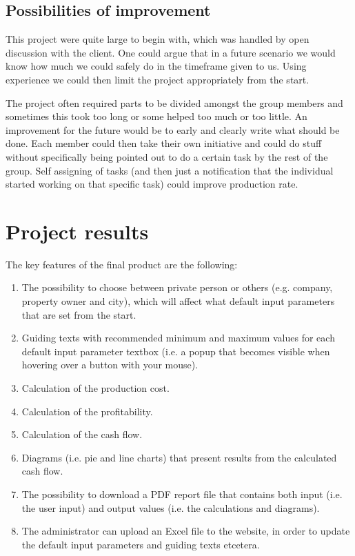\documentclass[]{article}
\begin{document}
\subsection{Possibilities of improvement}

This project were quite large to begin with, which was handled by open discussion with the client. One could argue that in a future scenario we would know how much we could safely do in the timeframe given to us. Using experience we could then limit the project appropriately from the start.

The project often required parts to be divided amongst the group members and sometimes this took too long or some helped too much or too little. An improvement for the future would be to early and clearly write what should be done. Each member could then take their own initiative and could do stuff without specifically being pointed out to do a certain task by the rest of the group. Self assigning of tasks (and then just a notification that the individual started working on that specific task) could improve production rate.

\section{Project results}

The key features of the final product are the following:

\begin{enumerate}
	\item The possibility to choose between private person or others (e.g. company, property owner and city), which will affect what default input parameters that are set from the start.
	\item Guiding texts with recommended minimum and maximum values for each default input parameter textbox (i.e. a popup that becomes visible when hovering over a button with your mouse).
	\item Calculation of the production cost.
	\item Calculation of the profitability.
	\item Calculation of the cash flow.
	\item Diagrams (i.e. pie and line charts) that present results from the calculated cash flow.
	\item The possibility to download a PDF report file that contains both input (i.e. the user input) and output values (i.e. the calculations and diagrams).
	\item The administrator can upload an Excel file to the website, in order to update the default input parameters and guiding texts etcetera.
\end{enumerate}
\end{document}

